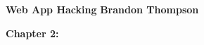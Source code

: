 \noindent
\textbf{Web App Hacking} \hfill \textbf{Brandon Thompson} \\

\begin{center}
\textbf{Chapter 2:}
\end{center}